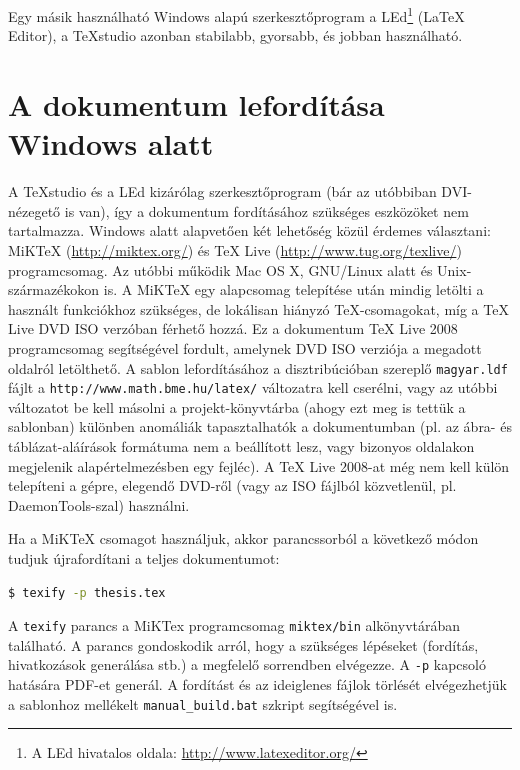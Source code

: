 Egy másik használható Windows alapú szerkesztőprogram a LEd\footnote{A LEd hivatalos oldala: \url{http://www.latexeditor.org/}} (LaTeX Editor), a TeXstudio azonban stabilabb, gyorsabb, és jobban használható.

\section{A dokumentum lefordítása Windows alatt}
A TeXstudio és a LEd kizárólag szerkesztőprogram (bár az utóbbiban DVI-nézegető is van), így a dokumentum fordításához szükséges eszközöket nem tartalmazza. Windows alatt alapvetően két lehetőség közül érdemes választani: MiKTeX (\url{http://miktex.org/}) és TeX Live (\url{http://www.tug.org/texlive/}) programcsomag. Az utóbbi működik Mac OS X, GNU/Linux alatt és Unix-származékokon is. A MiKTeX egy alapcsomag telepítése után mindig letölti a használt funkciókhoz szükséges, de lokálisan hiányzó \TeX-csomagokat, míg a TeX Live DVD ISO verzóban férhető hozzá. Ez a dokumentum TeX Live 2008 programcsomag segítségével fordult, amelynek DVD ISO verziója a megadott oldalról letölthető. A sablon lefordításához a disztribúcióban szereplő \verb+magyar.ldf+ fájlt a \verb+http://www.math.bme.hu/latex/+ változatra kell cserélni, vagy az utóbbi változatot be kell másolni a projekt-könyvtárba (ahogy ezt meg is tettük a sablonban) különben anomáliák tapasztalhatók a dokumentumban (pl. az ábra- és táblázat-aláírások formátuma nem a beállított lesz, vagy bizonyos oldalakon megjelenik alapértelmezésben egy fejléc). A TeX Live 2008-at még nem kell külön telepíteni a gépre, elegendő DVD-ről (vagy az ISO fájlból közvetlenül, pl. DaemonTools-szal) használni.

Ha a MiKTeX csomagot használjuk, akkor parancssorból a következő módon tudjuk újrafordítani a teljes dokumentumot:

\begin{lstlisting}[language=bash,frame=single,float=!ht]
$ texify -p thesis.tex
\end{lstlisting}

A \verb+texify+ parancs a MiKTex programcsomag \verb+miktex/bin+ alkönyvtárában található. A parancs gondoskodik arról, hogy a szükséges lépéseket (fordítás, hivatkozások generálása stb.) a megfelelő sorrendben elvégezze. A \verb+-p+ kapcsoló hatására PDF-et generál. A fordítást és az ideiglenes fájlok törlését elvégezhetjük a sablonhoz mellékelt \verb+manual_build.bat+ szkript segítségével is.

